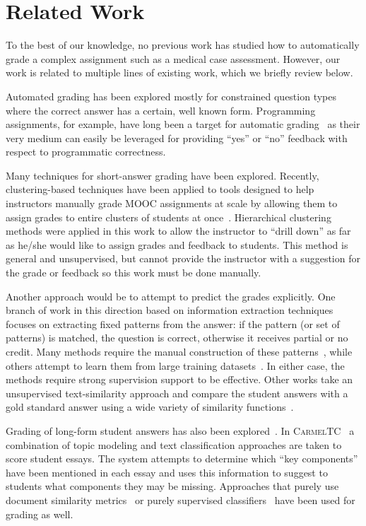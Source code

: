 \section{Related Work}

To the best of our knowledge, no previous work has studied how to automatically grade
a complex assignment such as a medical case assessment. However, our work
is related to multiple lines of existing work, which we briefly review below. 

Automated grading has been explored mostly for constrained question
types where the correct answer has a certain, well known form. Programming
assignments, for example, have long been a target for automatic
grading~\cite{Forsythe:1965:CACM, Hext:1969:CACM, Helmick:2007:ITICSE,
Martin:1973:SIGCSE} as their very medium can easily be leveraged for
providing ``yes'' or ``no'' feedback with respect to programmatic
correctness.

Many techniques for short-answer grading have been explored. Recently,
clustering-based techniques have been applied to tools designed to help
instructors manually grade MOOC assignments at scale by allowing them to
assign grades to entire clusters of students at
once~\cite{Brooks:2014:Powergrading}. Hierarchical clustering methods were
applied in this work to allow the instructor to ``drill down'' as far as
he/she would like to assign grades and feedback to students. This method
is general and unsupervised, but cannot provide the instructor with a
suggestion for the grade or feedback so this work must be done manually.

Another approach would be to attempt to predict the grades explicitly. One
branch of work in this direction based on information extraction techniques
focuses on extracting fixed patterns from the answer: if the pattern (or
set of patterns) is matched, the question is correct, otherwise it receives
partial or no credit. Many methods require the manual construction of these
patterns~\cite{Mitchell:2002:ICAA, Leacock:2003:CatH}, while others attempt to
learn them from large training datasets~\cite{Pulman:2005:EdAppsNLP}. In either
case, the methods require strong supervision support to be effective.  Other
works take an unsupervised text-similarity approach and compare the student
answers with a gold standard answer using a wide variety of similarity
functions~\cite{Mohler:2009:EACL}.

Grading of long-form student answers has also been
explored~\cite{Balfour:2013, Chen:2014:IRRODL}. In
\textsc{CarmelTC}~\cite{Rose:2003:HLT-NAACL-EDUC} a combination of topic
modeling and text classification approaches are taken to score student
essays. The system attempts to determine which ``key components'' have been
mentioned in each essay and uses this information to suggest to students
what components they may be missing. Approaches that purely use document
similarity metrics~\cite{Duwairi:2006:CHB} or purely supervised
classifiers~\cite{Larkey:1998:SIGIR} have been used for grading as well.

